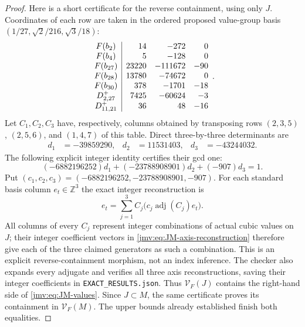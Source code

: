 \begin{proof}
Here is a short certificate for the reverse containment, using
only \(J\). Coordinates of each row are taken in the ordered
proposed value-group basis
\((1/27,\sqrt2/216,\sqrt3/18)\):
\begin{equation}
\begin{array}{c|r r r}
 F(b_2)&14&-272&0\\
 F(b_4)&5&-128&0\\
 F(b_{27})&23220&-111672&-90\\
 F(b_{28})&13780&-74672&0\\
 F(b_{30})&378&-1701&-18\\
 D^+_{2,27}&7425&-60624&-3\\
 D^+_{11,21}&36&48&-16
\end{array}.
\label{jmv:eq:JM-lower-certificate}
\end{equation}
Let \(C_1,C_2,C_3\) have, respectively, columns obtained by
transposing rows \((2,3,5)\), \((2,5,6)\), and \((1,4,7)\)
of this table. Direct three-by-three determinants are
\begin{align*}
 d_1&=-39859290,&d_2&=11531403,&d_3&=-43244032.
\end{align*}
The following explicit integer identity certifies their gcd one:
\begin{equation}
 (-6882196252)d_1+(-23788908901)d_2+(-907)d_3=1.
 \label{jmv:eq:JM-bezout}
\end{equation}
Put \((c_1,c_2,c_3)=(-6882196252,-23788908901,-907)\).
For each standard basis column \(e_t\in\mathbb Z^3\) the exact
integer reconstruction is
\begin{equation}
 e_t=\sum_{j=1}^3 C_j\bigl(c_j\operatorname{adj}(C_j)e_t\bigr).
 \label{jmv:eq:JM-axis-reconstruction}
\end{equation}
All columns of every \(C_j\) represent integer combinations of
actual cubic values on \(J\); their integer coefficient vectors
in \eqref{jmv:eq:JM-axis-reconstruction} therefore give each
of the three claimed generators as such a combination. This is
an explicit reverse-containment morphism, not an index inference.
The checker also expands every adjugate and verifies all three
axis reconstructions, saving their integer coefficients in
\texttt{EXACT\_RESULTS.json}. Thus \(\mathcal V_F(J)\) contains
the right-hand side of \eqref{jmv:eq:JM-values}. Since \(J\subset M\),
the same certificate proves its containment in \(\mathcal V_F(M)\).
The upper bounds already established finish both equalities.
\end{proof}

